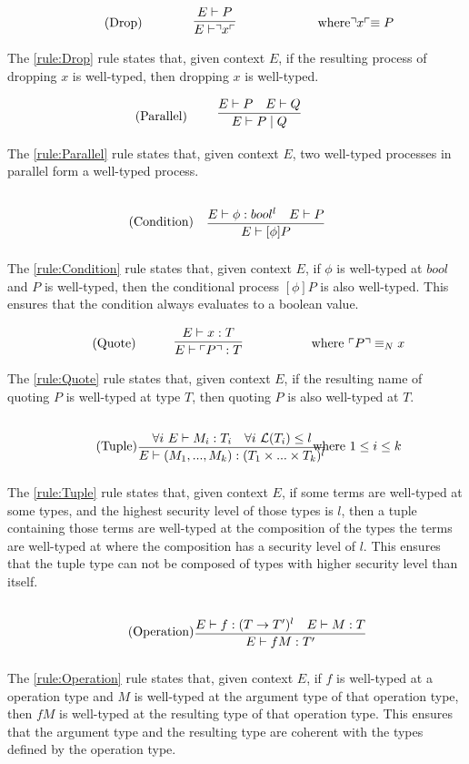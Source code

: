 \begin{align*}
    \tag{Drop}\label{rule:Drop} &\infrule{E \vdash P}{E\vdash \drop{x}}& \text{where} \drop{x} \equiv P
\end{align*}
The \ref{rule:Drop} rule states that, given context $E$, if the resulting process of dropping $x$ is well-typed, then dropping $x$ is well-typed.

\begin{align*}
    \tag{Parallel}\label{rule:Parallel} &\infrule{E\vdash P \quad E \vdash Q}{E \vdash P \para Q}
\end{align*}
The \ref{rule:Parallel} rule states that, given context $E$, two well-typed processes in parallel form a well-typed process.

\begin{align*}
    \tag{Condition}\label{rule:Condition} &\infrule{E\vdash \phi:bool^l\quad E\vdash P}{E \vdash [\phi] P}
\end{align*}
The \ref{rule:Condition} rule states that, given context $E$, if $\phi$ is well-typed at $bool$ and $P$ is well-typed, then the conditional process $[\phi]P$ is also well-typed. This ensures that the condition always evaluates to a boolean value.

\begin{align*}
    \tag{Quote}\label{rule:Quote} &\infrule{E \vdash x:T}{E\vdash \quot{P}:T}& \text{where}\ \quot{P} \equiv_N x
\end{align*}
The \ref{rule:Quote} rule states that, given context $E$, if the resulting name of quoting $P$ is well-typed at type $T$, then quoting $P$ is also well-typed at $T$.

\begin{align*}
    \tag{Tuple}\label{rule:Tuple} &\infrule{\forall i\ E\vdash M_i:T_i\quad \forall i\ \level{T_i}\leq l}{E\vdash (M_1,...,M_k):(T_1\times...\times T_k)^l}& \text{where}\ 1\leq i\leq k
\end{align*}
The \ref{rule:Tuple} rule states that, given context $E$, if some terms are well-typed at some types, and the highest security level of those types is $l$, then a tuple containing those terms are well-typed at the composition of the types the terms are well-typed at where the composition has a security level of $l$.
This ensures that the tuple type can not be composed of types with higher security level than itself.

\begin{align*}
    \tag{Operation}\label{rule:Operation} &\infrule{E\vdash f:(T\ra T')^l\quad E\vdash M:T}{E\vdash fM:T'}
\end{align*}
The \ref{rule:Operation} rule states that, given context $E$, if $f$ is well-typed at a operation type and $M$ is well-typed at the argument type of that operation type, then $fM$ is well-typed at the resulting type of that operation type.
This ensures that the argument type and the resulting type are coherent with the types defined by the operation type.

